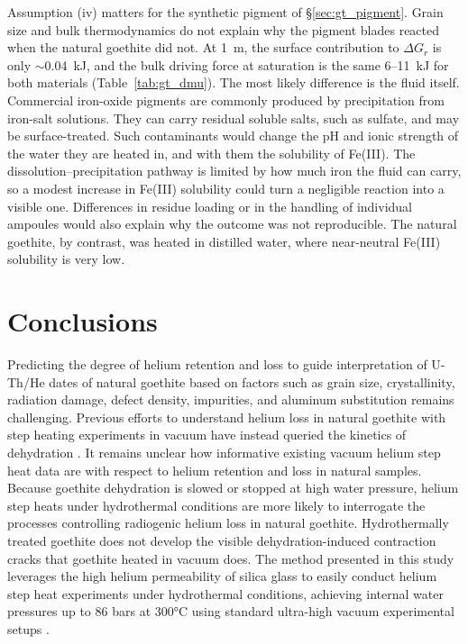 Assumption (iv) matters for the synthetic pigment of \S\ref{sec:gt_pigment}. Grain size and bulk
thermodynamics do not explain why the pigment blades reacted when the natural goethite did not. At 1~\textmu m, the surface contribution to $\Delta G_r$ is only
$\sim$0.04~kJ, and the bulk driving force at saturation is the same 6--11~kJ for both materials
(Table~\ref{tab:gt_dmu}). The most likely difference is the fluid itself. Commercial iron-oxide
pigments are commonly produced by precipitation from iron-salt solutions. They can carry
residual soluble salts, such as sulfate, and may be surface-treated. Such contaminants would
change the pH and ionic strength of the water they are heated in, and with them the solubility
of Fe(III). The dissolution--precipitation pathway is limited by how much iron the fluid can
carry, so a modest increase in Fe(III) solubility could turn a negligible reaction into a
visible one. Differences in residue loading or in the handling of individual ampoules would also
explain why the outcome was not reproducible. The natural goethite, by contrast, was heated in
distilled water, where near-neutral Fe(III) solubility is very low.

\clearpage

\section{Conclusions}\label{conclusions}

Predicting the degree of helium retention and loss to guide
interpretation of U-Th/He dates of natural goethite based on factors
such as grain size, crystallinity, radiation damage, defect density,
impurities, and aluminum substitution remains challenging. Previous
efforts to understand helium loss in natural goethite with step heating
experiments in vacuum have instead queried the kinetics of dehydration
\citep{farley2024}. It remains unclear how informative existing
vacuum helium step heat data are with respect to helium retention and
loss in natural samples. Because goethite dehydration is slowed or
stopped at high water pressure, helium step heats under hydrothermal
conditions are more likely to interrogate the processes controlling
radiogenic helium loss in natural goethite. Hydrothermally treated goethite does not develop the
visible dehydration-induced contraction cracks that goethite heated in vacuum does. The method
presented in this
study leverages the high helium permeability of silica glass to easily
conduct helium step heat experiments under hydrothermal conditions,
achieving internal water pressures up to 86 bars at 300°C using standard
ultra-high vacuum experimental setups \citep{farley1999}.

